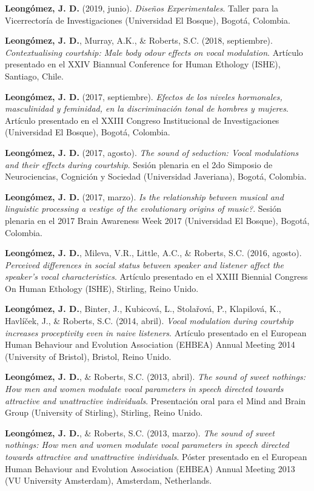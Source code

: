 \documentclass[11pt,a4paper,]{awesome-cv}
\begin{document}
\textbf{Leongómez, J. D.} (2019, junio). \emph{Diseños Experimentales}.
Taller para la Vicerrectoría de Investigaciones (Universidad El Bosque),
Bogotá, Colombia.

\textbf{Leongómez, J. D.}, Murray, A.K., \& Roberts, S.C. (2018,
septiembre). \emph{Contextualising courtship: Male body odour effects on
vocal modulation}. Artículo presentado en el XXIV Biannual Conference
for Human Ethology (ISHE), Santiago, Chile.

\textbf{Leongómez, J. D.} (2017, septiembre). \emph{Efectos de los
niveles hormonales, masculinidad y feminidad, en la discriminación tonal
de hombres y mujeres}. Artículo presentado en el XXIII Congreso
Institucional de Investigaciones (Universidad El Bosque), Bogotá,
Colombia.

\textbf{Leongómez, J. D.} (2017, agosto). \emph{The sound of seduction:
Vocal modulations and their effects during courtship}. Sesión plenaria
en el 2do Simposio de Neurociencias, Cognición y Sociedad (Universidad
Javeriana), Bogotá, Colombia.

\textbf{Leongómez, J. D.} (2017, marzo). \emph{Is the relationship
between musical and linguistic processing a vestige of the evolutionary
origins of music?}. Sesión plenaria en el 2017 Brain Awareness Week 2017
(Universidad El Bosque), Bogotá, Colombia.

\textbf{Leongómez, J. D.}, Mileva, V.R., Little, A.C., \& Roberts, S.C.
(2016, agosto). \emph{Perceived differences in social status between
speaker and listener affect the speaker's vocal characteristics}.
Artículo presentado en el XXIII Biennial Congress On Human Ethology
(ISHE), Stirling, Reino Unido.

\textbf{Leongómez, J. D.}, Binter, J., Kubicová, L., Stolařová, P.,
Klapilová, K., Havlíček, J., \& Roberts, S.C. (2014, abril). \emph{Vocal
modulation during courtship increases proceptivity even in naive
listeners}. Artículo presentado en el European Human Behaviour and
Evolution Association (EHBEA) Annual Meeting 2014 (University of
Bristol), Bristol, Reino Unido.

\textbf{Leongómez, J. D.}, \& Roberts, S.C. (2013, abril). \emph{The
sound of sweet nothings: How men and women modulate vocal parameters in
speech directed towards attractive and unattractive individuals}.
Presentación oral para el Mind and Brain Group (University of Stirling),
Stirling, Reino Unido.

\textbf{Leongómez, J. D.}, \& Roberts, S.C. (2013, marzo). \emph{The
sound of sweet nothings: How men and women modulate vocal parameters in
speech directed towards attractive and unattractive individuals}. Póster
presentado en el European Human Behaviour and Evolution Association
(EHBEA) Annual Meeting 2013 (VU University Amsterdam), Amsterdam,
Netherlands.
\end{document}
